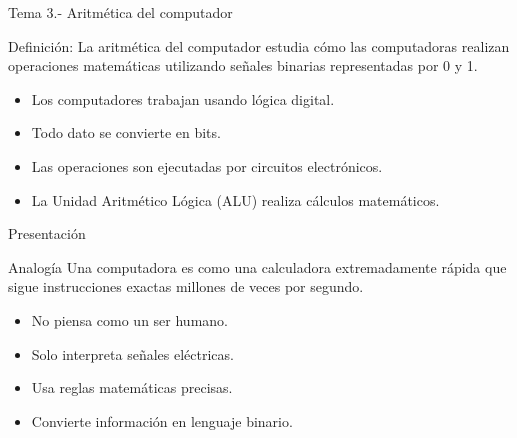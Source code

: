 \documentclass[10pt, aspectratio=169]{beamer}
\begin{document}
	
	\begin{frame}{Tema 3.- Aritmética del computador}
		
		\begin{block}{Definición:}
			La aritmética del computador estudia cómo las computadoras realizan operaciones matemáticas utilizando señales binarias representadas por 0 y 1.
		\end{block}
		
		\begin{itemize}
			\item Los computadores trabajan usando lógica digital.
			\item Todo dato se convierte en bits.
			\item Las operaciones son ejecutadas por circuitos electrónicos.
			\item La Unidad Aritmético Lógica (ALU) realiza cálculos matemáticos.
		\end{itemize}
		
	\end{frame}
	
	\begin{frame}{Presentación}
		
		\begin{block}{Analogía}
			Una computadora es como una calculadora extremadamente rápida que sigue instrucciones exactas millones de veces por segundo.
		\end{block}
		
		\begin{itemize}
			\item No piensa como un ser humano.
			\item Solo interpreta señales eléctricas.
			\item Usa reglas matemáticas precisas.
			\item Convierte información en lenguaje binario.
		\end{itemize}
		
	\end{frame}
	
\end{document}
